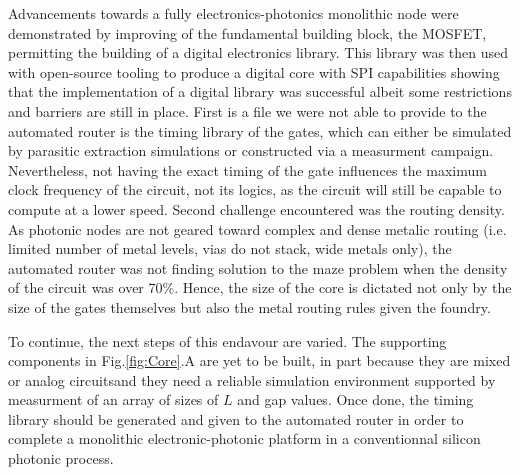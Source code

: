 Advancements towards a fully electronics-photonics monolithic node were demonstrated by improving of the fundamental building block, the MOSFET, permitting the building of a digital electronics library. 
This library was then used with open-source tooling to produce a digital core with SPI capabilities showing that the implementation of a digital library was successful albeit some restrictions and barriers are still in place.
First is a file we were not able to provide to the automated router is the timing library of the gates, which can either be simulated by parasitic extraction simulations or constructed via a measurment campaign.
Nevertheless, not having the exact timing of the gate influences the maximum clock frequency of the circuit, not its logics, as the circuit will still be capable to compute at a lower speed. 
Second challenge encountered was the routing density. 
As photonic nodes are not geared toward complex and dense metalic routing (i.e. limited number of metal levels, vias do not stack, wide metals only), the automated router was not finding solution to the maze problem when the density of the circuit was over 70\%. 
Hence, the size of the core is dictated not only by the size of the gates themselves but also the metal routing rules given the foundry. 

To continue, the next steps of this endavour are varied.
The supporting components in Fig.\ref{fig:Core}.A are yet to be built, in part because they are mixed or analog circuitsand they need a reliable simulation environment supported by measurment of an array of sizes of $L$ and gap values.
Once done, the timing library should be generated and given to the automated router in order to complete a monolithic electronic-photonic platform in a conventionnal silicon photonic process. 


